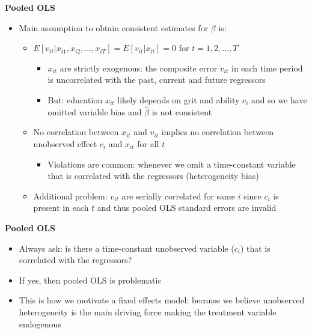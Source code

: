 \documentclass[notes=show]{beamer}
\begin{document}
\begin{frame}[plain]
	\begin{center}
	\textbf{Pooled OLS}
	\end{center}
	
	\begin{itemize}
	\item Main assumption to obtain consistent estimates for $\beta$ is:
		\begin{itemize}
		\item $E[v_{it} | x_{i1},x_{i2}, \dots, x_{iT}] = E[v_{it} | x_{it}] = 0$ for $t=1,2,\dots, T$
			\begin{itemize}
			\item $x_{it}$ are strictly exogenous: the composite error $v_{it}$ in each time period is uncorrelated with the past, current and future regressors
			\item But: education $x_{it}$ likely depends on grit and ability $c_i$ and so we have omitted variable bias and $\widehat{\beta}$ is not consistent
			\end{itemize}
		\item No correlation between $x_{it}$ and $v_{it}$ implies no correlation between unobserved effect $c_i$ and $x_{it}$ for all $t$
			\begin{itemize}
			\item Violations are common: whenever we omit a time-constant variable that is correlated with the regressors (heterogeneity bias)
			\end{itemize}
		\item Additional problem: $v_{it}$ are serially correlated for same $i$ since $c_i$ is present in each $t$ and thus pooled OLS standard errors are invalid
		\end{itemize}
	\end{itemize}
\end{frame}

\begin{frame}[plain]
	\begin{center}
	\textbf{Pooled OLS}
	\end{center}
	
	\begin{itemize}
	\item Always ask: is there a time-constant unobserved variable ($c_i$) that is correlated with the regressors?  
	\item If yes, then pooled OLS is problematic
	\item This is how we motivate a fixed effects model: because we believe unobserved heterogeneity is the main driving force making the treatment variable endogenous
	\end{itemize}
\end{frame}
\end{document}
